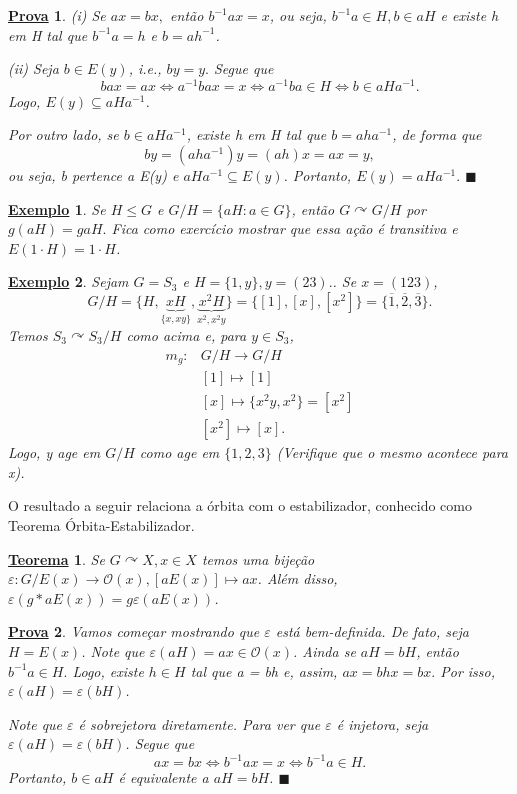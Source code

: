 \documentclass{article}
\newtheorem*{theorem*}{\underline{Teorema}}
\newtheorem{example*}{\underline{Exemplo}}
\newtheorem*{proof*}{\underline{Prova}}
\renewcommand\qedsymbol{$\blacksquare$}
\begin{document}
\begin{proof*}
  (i) Se \(ax = bx,\) então \(b^{-1}ax = x\), ou seja, \(b^{-1}a\in H, b\in aH\) e existe h em H tal que \(b^{-1}a = h\) e \(b = ah^{-1}\).

  (ii) Seja \(b\in E(y)\), i.e., \(by=y.\) Segue que 
    \[
      bax = ax \Longleftrightarrow a^{-1}bax = x \Longleftrightarrow a^{-1}ba\in H \Longleftrightarrow b\in aHa^{-1}.
    \]
    Logo, \(E(y)\subseteq{aHa^{-1}}\). 

    Por outro lado, se \(b\in aHa^{-1}\), existe h em H tal que \(b = aha^{-1}\), de forma que 
      \[
        by = (aha^{-1})y = (ah)x = ax = y,
      \]
    ou seja, b pertence a E(y) e \(aHa^{-1}\subseteq{E(y)}\). Portanto, \(E(y) = aHa^{-1}.\) \qedsymbol
\end{proof*}
\begin{example*}
  Se \(H\leq G\) e \(G/H = \{aH: a \in G\}\), então \(G \curvearrowright  G/H\) por \(g(aH) = gaH.\) Fica como exercício mostrar que essa a\c cão
  é transitiva e \(E(1 \cdot H) = 1 \cdot H\).
\end{example*}
\begin{example*}
  Sejam \(G = S_{3}\) e \(H = \{1, y\}, y = (23).\). Se \(x=(123)\), 
    \[
      G/H = \{H, \underbrace{xH}_{\{x, xy\}}, \underbrace{x^{2}H}_{x^{2}, x^{2}y}\} = \{[1], [x], [x^{2}]\} = \{\overline{1}, \overline{2}, \overline{3}\}.
    \]
  Temos \(S_{3} \curvearrowright S_{3}/H\) como acima e, para \(y\in S_{3}\), 
     \begin{align*}
       m_{g}:&G/H\rightarrow G/H\\
             &[1]\mapsto[1]\\
             &[x]\mapsto\{x^{2}y, x^{2}\} = [x^{2}]\\
             &[x^{2}]\mapsto[x].
     \end{align*}
    Logo, y age em \(G/H\) como age em \(\{1, 2, 3\}\) (Verifique que o mesmo acontece para x).
\end{example*} 
  O resultado a seguir relaciona a órbita com o estabilizador, conhecido como Teorema Órbita-Estabilizador.
    \hypertarget{orbit_stabilizer}{
     \begin{theorem*}
       Se \(G \curvearrowright X, x\in X\) temos uma bije\c cão \(\varepsilon :G/E(x)\rightarrow \mathcal{O}(x), [aE(x)]\mapsto ax\). Além disso,
       \(\varepsilon (g*aE(x)) = g\varepsilon (aE(x))\).
     \end{theorem*}
    }
   \begin{proof*}
     Vamos come\c car mostrando que \(\varepsilon \) está bem-definida. De fato, seja \(H = E(x)\). Note que \(\varepsilon (aH) = ax\in \mathcal{O}(x)\).
     Ainda se \(aH = bH\), então \(b^{-1}a\in H.\) Logo, existe \(h\in H\) tal que a = bh e, assim, \(ax = bhx = bx.\) Por isso, \(\varepsilon (aH) = \varepsilon (bH)\).

     Note que \(\varepsilon  \) é sobrejetora diretamente. Para ver que \(\varepsilon \) é injetora, seja \(\varepsilon (aH) = \varepsilon (bH)\). Segue que 
       \[
         ax = bx \Longleftrightarrow b^{-1}ax = x \Longleftrightarrow b^{-1}a\in H.
       \]
       Portanto, \(b\in aH\) é equivalente a \(aH = bH\). \qedsymbol
   \end{proof*}
\end{document}
